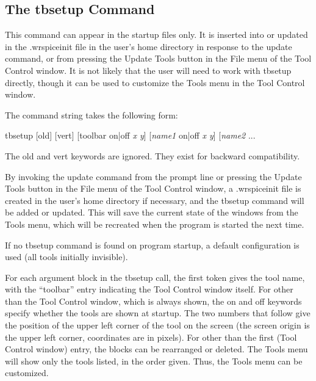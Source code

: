 \subsection{The {\vt tbsetup} Command}



This command can appear in the startup files only.  It is inserted
into or updated in the {\vt .wrspiceinit} file in the user's home
directory in response to the {\cb update} command, or from pressing
the {\cb Update Tools} button in the {\cb File} menu of the {\cb Tool
Control window}.  It is not likely that the user will need to work
with {\cb tbsetup} directly, though it can be used to customize the
{\cb Tools} menu in the {\cb Tool Control} window.

The command string takes the following form:
\begin{lquote}{\vt
tbsetup [old] [vert] [toolbar on|off {\it x y}] [{\it name1} on|off {\it x y}]
 [{\it name2} ...}
\end{lquote}
The {\vt old} and {\vt vert} keywords are ignored.  They exist for
backward compatibility.

By invoking the {\cb update} command from the prompt line or pressing
the {\cb Update Tools} button in the {\cb File} menu of the {\cb Tool
Control} window, a {\vt .wrspiceinit} file is created in the user's
home directory if necessary, and the {\cb tbsetup} command will be
added or updated.  This will save the current state of the windows
from the {\cb Tools} menu, which will be recreated when the program is
started the next time.

If no {\cb tbsetup} command is found on program startup, a
default configuration is used (all tools initially invisible).

For each argument block in the {\cb tbsetup} call, the first token
gives the tool name, with the ``{\vt toolbar}'' entry indicating the
{\cb Tool Control} window itself.  For other than the {\cb Tool
Control} window, which is always shown, the {\vt on} and {\vt off}
keywords specify whether the tools are shown at startup.  The two
numbers that follow give the position of the upper left corner of the
tool on the screen (the screen origin is the upper left corner,
coordinates are in pixels).  For other than the first ({\cb Tool
Control} window) entry, the blocks can be rearranged or deleted.  The
{\cb Tools} menu will show only the tools listed, in the order given. 
Thus, the {\cb Tools} menu can be customized.

